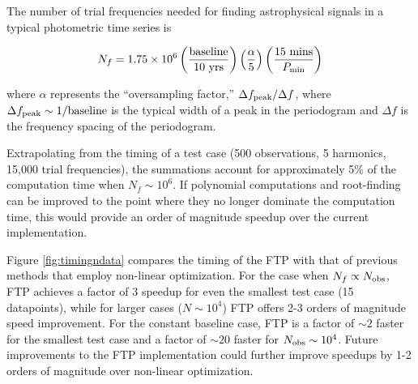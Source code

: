 \documentclass{aastex62}
\begin{document}
The number of trial frequencies needed for finding astrophysical signals in a typical photometric time series is

\begin{equation}
N_f = 1.75 \times 10^6 \left(\frac{{\rm baseline}}{10~{\rm yrs}}\right)\left(\frac{\alpha}{5}\right)\left(\frac{15~{\rm mins}}{P_{\rm min}}\right)
\end{equation}

\noindent where $\alpha$ represents the ``oversampling factor,'' $\Delta f_{\rm peak} / \Delta f$, where $\Delta f_{\rm peak} \sim 1/{\rm baseline}$ is
the typical width of a peak in the periodogram and $\Delta f$ is the frequency spacing of the periodogram.

Extrapolating from the timing of a test case (500 observations, 5 harmonics, 15,000 trial frequencies), the summations
account for approximately 5\% of the computation time when $N_f \sim 10^6$. If polynomial computations and
root-finding can be improved to the point where they no longer dominate the computation time, this would provide an
order of magnitude speedup over the current implementation.

Figure \ref{fig:timingndata} compares the timing of the FTP with that of previous methods that employ
non-linear optimization. For the case when $N_f\propto N_{\rm obs}$, FTP achieves a factor of 3 speedup for even
the smallest test case (15 datapoints), while for larger cases ($N\sim10^4$) FTP offers 2-3 orders of magnitude
speed improvement. For the constant baseline case, FTP is a factor of $\sim 2$ faster for the smallest test case
and a factor of $\sim 20$ faster for $N_{\rm obs}\sim 10^4$. Future improvements to the FTP implementation
could further improve speedups by 1-2 orders of magnitude over non-linear optimization.


%

%
\end{document}
